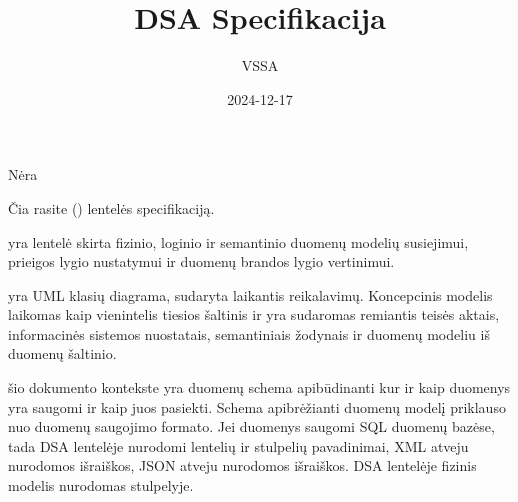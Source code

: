 \documentclass[letterpaper,10pt,lithuanian]{sphinxmanual}
\title{DSA Specifikacija}
\date{2024-12-17}
\author{VSSA}
\begin{document}
\pagestyle{empty}
\sphinxmaketitle
\pagestyle{plain}
\sphinxtableofcontents
\pagestyle{normal}
\label{\detokenize{index::doc}}

\begin{description}
\sphinxAtStartPar
{}

\sphinxAtStartPar
{}

\sphinxAtStartPar
{}

\sphinxAtStartPar
Nėra

\sphinxAtStartPar
{}

\sphinxAtStartPar
{}

\sphinxAtStartPar
{}

\end{description}

\sphinxAtStartPar
Čia rasite  ({\hyperref[\detokenize{savokos:term-DSA}]{}}) lentelės specifikaciją.

\sphinxAtStartPar
{} yra lentelė skirta fizinio, loginio ir
semantinio duomenų modelių susiejimui, prieigos lygio nustatymui ir duomenų
brandos lygio vertinimui.

\noindent{}

\sphinxAtStartPar
{} yra UML klasių diagrama, sudaryta laikantis
 reikalavimų. Koncepcinis modelis laikomas
kaip vienintelis tiesios šaltinis ir yra sudaromas remiantis teisės aktais,
informacinės sistemos nuostatais, semantiniais žodynais ir duomenų modeliu iš
duomenų šaltinio.

\sphinxAtStartPar
{} šio dokumento kontekste yra duomenų schema apibūdinanti
kur ir kaip duomenys yra saugomi ir kaip juos pasiekti. Schema apibrėžianti
duomenų modelį priklauso nuo duomenų saugojimo formato. Jei duomenys saugomi
SQL duomenų bazėse, tada DSA lentelėje nurodomi lentelių ir stulpelių
pavadinimai, XML atveju nurodomos  išraiškos, JSON atveju nurodomos
 išraiškos. DSA lentelėje fizinis modelis nurodomas 
stulpelyje.
\end{document}
